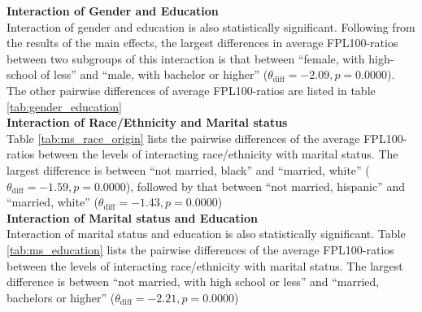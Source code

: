 \documentclass[11pt]{extarticle} %
\begin{document}
\noindent
{\bf{Interaction of Gender and Education}} \\
Interaction of gender and education is also statistically significant. Following from the results of the main effects, the largest differences in average FPL100-ratios between two subgroups of this interaction is that between ``female, with high-school of less'' and ``male, with bachelor or higher'' ($\theta_{\text{diff}} = -2.09, p = 0.0000 $). The other pairwise differences of average FPL100-ratios are listed in table \ref{tab:gender_education}\\
\noindent
{\bf{Interaction of Race/Ethnicity and Marital status}} \\
Table \ref{tab:ms_race_origin} lists the pairwise differences of the average FPL100-ratios between the levels of interacting race/ethnicity with marital status. The largest difference is between ``not married, black'' and ``married, white'' ($\theta_{\text{diff}} = -1.59, p = 0.0000 $), followed by that between ``not married, hispanic'' and ``married, white'' ($\theta_{\text{diff}} = -1.43, p = 0.0000 $) \\
\noindent
{\bf{Interaction of Marital status and Education}} \\
Interaction of marital status and education is also statistically significant. Table \ref{tab:ms_education} lists the pairwise differences of the average FPL100-ratios between the levels of interacting race/ethnicity with marital status. The largest difference is between ``not married, with high school or less'' and ``married, bachelors or higher'' ($\theta_{\text{diff}} = -2.21, p = 0.0000 $)\\
\end{document}
